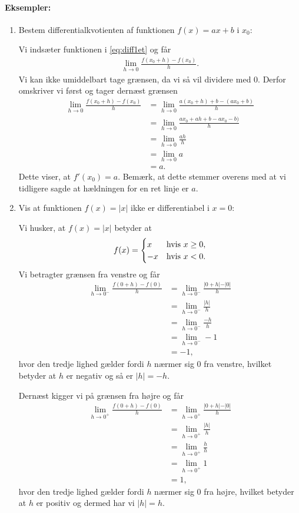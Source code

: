 \paragraph*{Eksempler:}
\begin{enumerate}
\item Bestem differentialkvotienten af funktionen $f(x)=ax+b$ i $x_0$:

Vi indsæter funktionen i \eqref{eq:diff1et} og får
\begin{align*}
\lim_{h \to 0} \frac{f(x_0+h)-f(x_0)}{h}.
\end{align*}
Vi kan ikke umiddelbart tage grænsen, da vi så vil dividere med $0$. Derfor omskriver vi først og tager dernæst grænsen
\begin{align*}
\lim_{h \to 0} \frac{f(x_0+h)-f(x_0)}{h} &= \lim_{h \to 0} \frac{a(x_0+h)+b-(ax_0+b)}{h}\\
&= \lim_{h \to 0} \frac{ax_0+ah+b-ax_0-b)}{h} \\
&= \lim_{h \to 0} \frac{ah}{h} \\
&= \lim_{h \to 0} a \\
&= a.
\end{align*}
Dette viser, at $f'(x_0)=a$. Bemærk, at dette stemmer overens med at vi tidligere sagde at hældningen for en ret linje er $a$.
\item Vis at funktionen $f(x)=\vert x \vert$ ikke er differentiabel i $x=0$:

Vi husker, at $f(x)=\vert x \vert$ betyder at
\begin{align*}
f(x) = \begin{cases}
x & \textup{hvis } x \geq 0, \\
-x & \textup{hvis } x <0.
\end{cases}
\end{align*}
Vi betragter grænsen fra venstre og får
\begin{align*}
\lim_{h \to 0^-} \frac{f(0+h)-f(0)}{h} &= \lim_{h \to 0^-} \frac{\vert 0 + h \vert - \vert 0 \vert}{h} \\
&= \lim_{h \to 0^-} \frac{\vert h \vert}{h} \\
&= \lim_{h \to 0^-} \frac{-h}{h} \\
&= \lim_{h \to 0^-} -1 \\
&= -1,
\end{align*}
hvor den tredje lighed gælder fordi $h$ nærmer sig $0$ fra venstre, hvilket betyder at $h$ er negativ og så er $\vert h \vert = -h$.

Dernæst kigger vi på grænsen fra højre og får
\begin{align*}
\lim_{h \to 0^+} \frac{f(0+h)-f(0)}{h} &= \lim_{h \to 0^+} \frac{\vert 0 + h \vert - \vert 0 \vert}{h} \\
&= \lim_{h \to 0^+} \frac{\vert h \vert}{h} \\
&= \lim_{h \to 0^+} \frac{h}{h} \\
&= \lim_{h \to 0^+} 1 \\
&= 1,
\end{align*}
hvor den tredje lighed gælder fordi $h$ nærmer sig $0$ fra højre, hvilket betyder at $h$ er positiv og dermed har vi $\vert h \vert =h$.


\end{enumerate}
